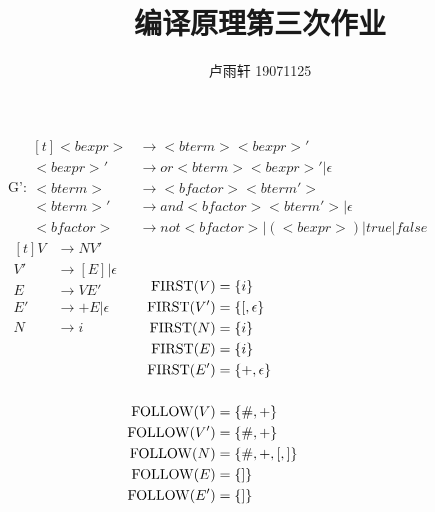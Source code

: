 \documentclass{ctexart}
\title{编译原理第三次作业}
\author{卢雨轩 19071125}
\DeclarePairedDelimiter{\set}{\{}{\}}
\DeclareMathOperator{\first}{FIRST}
\DeclareMathOperator{\follow}{FOLLOW}
\begin{document}
\maketitle

\begin{outline}
    \1[4.] G':$
    \begin{aligned}[t]
        <bexpr> &\to <bterm> <bexpr>' \\
        <bexpr>' &\to or <bterm> <bexpr>' | \epsilon \\
        <bterm> &\to <bfactor> <bterm'> \\
        <bterm>' &\to and <bfactor> <bterm'> | \epsilon \\
        <bfactor> &\to not <bfactor> | (<bexpr>) | true | false
    \end{aligned}$
    \1[13.]
        \2[$G_1$]
            \3[(1)]
                $\begin{aligned}[t]
                    V &\to NV' \\
                    V' &\to [E] | \epsilon \\
                    E &\to V E' \\
                    E' &\to +E | \epsilon \\
                    N &\to i
                \end{aligned}$
            \3[(2)]
                $\begin{aligned}[t]
                    \first(V) &= \set{i} \\
                    \first(V') &= \set{[, \epsilon} \\
                    \first(N) &= \set{i} \\
                    \first(E) &= \set{i} \\
                    \first(E') &= \set{+, \epsilon} \\
                    \\
                    \follow(V) &= \set{\#, +} \\
                    \follow(V') &= \set{\#, +} \\
                    \follow(N) &= \set{\#, +, [, ]} \\
                    \follow(E) &= \set{]} \\
                    \follow(E') &= \set{]} \\
                \end{aligned}$
            \3[(3)]


\end{outline}
\end{document}
